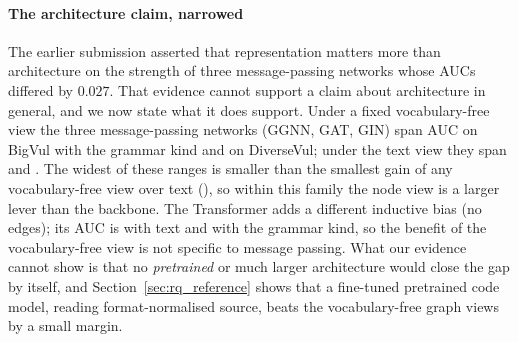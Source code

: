 \paragraph{The architecture claim, narrowed} The earlier submission asserted
that representation matters more than architecture on the strength of three
message-passing networks whose AUCs differed by $0.027$. That evidence cannot
support a claim about architecture in general, and we now state what it does
support. Under a fixed vocabulary-free view the three message-passing
networks (GGNN, GAT, GIN) span \numbvSpreadKind{} AUC on BigVul with the
grammar kind and \numdvSpreadKind{} on DiverseVul; under the text view they
span \numbvSpreadLex{} and \numdvSpreadLex{}. The widest of these ranges is
smaller than the smallest gain of any vocabulary-free view over text
(\numdeltaMin{}), so within this family the node view is a larger lever than
the backbone. The Transformer adds a different inductive bias (no edges); its
AUC is \mBvTfLexAuc{} with text and \mBvTfKindAuc{} with the grammar kind, so
the benefit of the vocabulary-free view is not specific to message passing.
What our evidence cannot show is that no \emph{pretrained} or much larger
architecture would close the gap by itself, and Section~\ref{sec:rq_reference}
shows that a fine-tuned pretrained code model, reading format-normalised source,
beats the vocabulary-free graph views by a small margin.
